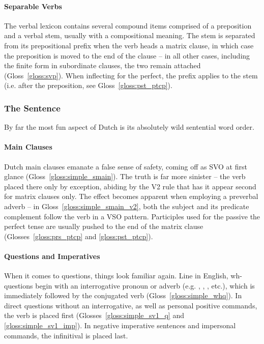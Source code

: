 \paragraph{Separable Verbs} 
The verbal lexicon contains several compound items comprised of a preposition and a verbal stem, usually with a compositional meaning.
The stem is separated from its prepositional prefix when the verb heads a matrix clause, in which case the preposition is moved to the end of the clause -- in all other cases, including the finite form in subordinate clauses, the two remain attached (Gloss~\ref{gloss:svp}).
When inflecting for the perfect, the prefix applies to the stem (i.e. after the preposition, see Gloss~\ref{gloss:pst_ptcp}).

\subsubsection{The Sentence}
By far the most fun aspect of Dutch is its absolutely wild sentential word order.


\paragraph{Main Clauses}
Dutch main clauses emanate a false sense of safety, coming off as SVO at first glance (Gloss~\ref{gloss:simple_smain}).
The truth is far more sinister -- the verb placed there only by exception, abiding by the V2 rule that has it appear second for matrix clauses only.
The effect becomes apparent when employing a preverbal adverb -- in Gloss~\ref{gloss:simple_smain_v2}, both the subject and its predicate complement follow the verb in a VSO pattern.
Participles used for the passive the perfect tense are usually pushed to the end of the matrix clause (Glosses~\ref{gloss:prs_ptcp} and \ref{gloss:pst_ptcp}).

\paragraph{Questions and Imperatives}
When it comes to questions, things look familiar again.
Line in English, wh-questions begin with an interrogative pronoun or adverb (e.g. , , ,  etc.), which is immediately followed by the conjugated verb (Gloss~\ref{gloss:simple_whq}).
In direct questions without an interrogative, as well as personal positive commands, the verb is placed first (Glosses~\ref{gloss:simple_sv1_q} and \ref{gloss:simple_sv1_imp}).
In negative imperative sentences and impersonal commands, the infinitival is placed last.

